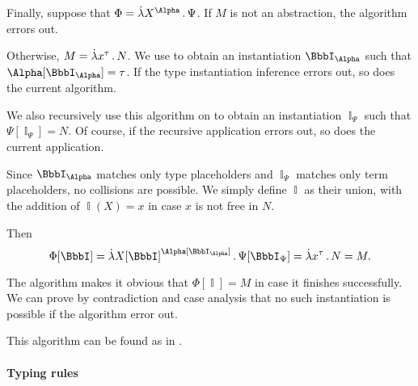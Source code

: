 \begin{algorithm}
\begin{thmenum}
     Finally, suppose that \( \Phi = \qabs {X^\Alpha} \Psi \). If \( M \) is not an abstraction, the algorithm errors out.

    Otherwise, \( M = \qabs {x^\tau} N \). We use  to obtain an instantiation \( \BbbI_\Alpha \) such that \( \Alpha[\BbbI_\Alpha] = \tau \). If the type instantiation inference errors out, so does the current algorithm.

    We also recursively use this algorithm on to obtain an instantiation \( \BbbI_\Psi \) such that \( \Psi[\BbbI_\Psi] = N \). Of course, if the recursive application errors out, so does the current application.

    Since \( \BbbI_\Alpha \) matches only type placeholders and \( \BbbI_\Psi \) matches only term placeholders, no collisions are possible. We simply define \( \BbbI \) as their union, with the addition of \( \BbbI(X) = x \) in case \( x \) is not free in \( N \).

    Then
    \begin{equation*}
      \Phi[\BbbI] = \qabs {{X[\BbbI]}^{\Alpha[\BbbI_\Alpha]}} \Psi[\BbbI_\Psi] = \qabs {x^\tau} N = M.
    \end{equation*}
  \end{thmenum}
\end{algorithm}
\begin{defproof}
  The algorithm makes it obvious that \( \Phi[\BbbI] = M \) in case it finishes successfully. We can prove by contradiction and case analysis that no such instantiation is possible if the algorithm error out.
\end{defproof}
\begin{comments}
  \item This algorithm can be found as  in \cite{notebook:code}.
\end{comments}

\paragraph{Typing rules}

